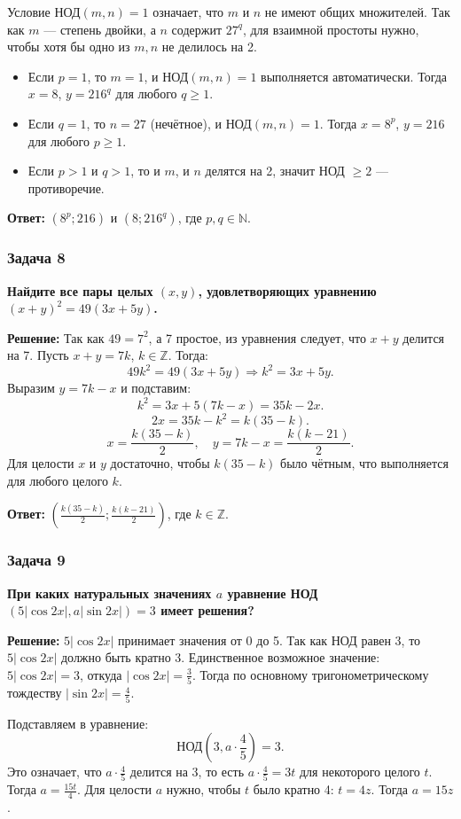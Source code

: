 \documentclass[12pt, a4paper]{article}
\begin{document}
Условие НОД$(m,n)=1$ означает, что $m$ и $n$ не имеют общих множителей. Так как $m$ — степень двойки, а $n$ содержит $27^q$, для взаимной простоты нужно, чтобы хотя бы одно из $m, n$ не делилось на 2.

\begin{itemize}
    \item Если $p = 1$, то $m = 1$, и НОД$(m,n)=1$ выполняется автоматически. Тогда $x = 8$, $y = 216^q$ для любого $q \ge 1$.
    \item Если $q = 1$, то $n = 27$ (нечётное), и НОД$(m,n)=1$. Тогда $x = 8^p$, $y = 216$ для любого $p \ge 1$.
    \item Если $p > 1$ и $q > 1$, то и $m$, и $n$ делятся на 2, значит НОД $\ge 2$ — противоречие.
\end{itemize}

\textbf{Ответ:} $(8^p; 216)$ и $(8; 216^q)$, где $p, q \in \mathbb{N}$.

\subsubsection*{Задача 8}
\textbf{Найдите все пары целых $(x, y)$, удовлетворяющих уравнению $(x + y)^2 = 49(3x + 5y)$.}

\textbf{Решение:}
Так как $49 = 7^2$, а 7 простое, из уравнения следует, что $x + y$ делится на 7. Пусть $x + y = 7k$, $k \in \mathbb{Z}$. Тогда:
\[
49k^2 = 49(3x + 5y) \Rightarrow k^2 = 3x + 5y.
\]
Выразим $y = 7k - x$ и подставим:
\[
k^2 = 3x + 5(7k - x) = 35k - 2x.
\]
\[
2x = 35k - k^2 = k(35 - k).
\]
\[
x = \frac{k(35-k)}{2}, \quad y = 7k - x = \frac{k(k-21)}{2}.
\]
Для целости $x$ и $y$ достаточно, чтобы $k(35-k)$ было чётным, что выполняется для любого целого $k$.

\textbf{Ответ:} $\left(\frac{k(35-k)}{2}; \frac{k(k-21)}{2}\right)$, где $k \in \mathbb{Z}$.

\subsubsection*{Задача 9}
\textbf{При каких натуральных значениях $a$ уравнение НОД$(5|\cos 2x|, a|\sin 2x|) = 3$ имеет решения?}

\textbf{Решение:}
$5|\cos 2x|$ принимает значения от 0 до 5. Так как НОД равен 3, то $5|\cos 2x|$ должно быть кратно 3. Единственное возможное значение: $5|\cos 2x| = 3$, откуда $|\cos 2x| = \frac{3}{5}$. Тогда по основному тригонометрическому тождеству $|\sin 2x| = \frac{4}{5}$.

Подставляем в уравнение:
\[
\text{НОД}\left(3, a \cdot \frac{4}{5}\right) = 3.
\]
Это означает, что $a \cdot \frac{4}{5}$ делится на 3, то есть $a \cdot \frac{4}{5} = 3t$ для некоторого целого $t$. Тогда $a = \frac{15t}{4}$. Для целости $a$ нужно, чтобы $t$ было кратно 4: $t = 4z$. Тогда $a = 15z$.
\end{document}
